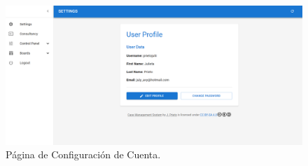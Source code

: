 \begin{figure}[H]
    \centering
    \includegraphics[width=1\linewidth]{fig/settings-real-page.png}
    \caption{Página de Configuración de Cuenta.}
    \label{fig:settings-page}
\end{figure}
